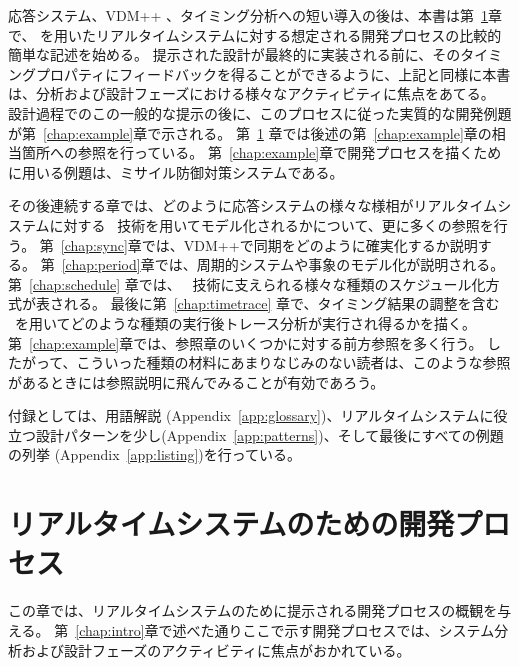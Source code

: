 \documentclass[\pformat,12pt]{jreport}
\begin{document}
応答システム、VDM++ 、タイミング分析への短い導入の後は、本書は第~\ref{chap:process}章で、 \VDMTools を用いたリアルタイムシステムに対する想定される開発プロセスの比較的簡単な記述を始める。
提示された設計が最終的に実装される前に、そのタイミングプロパティにフィードバックを得ることができるように、上記と同様に本書は、分析および設計フェーズにおける様々なアクティビティに焦点をあてる。
設計過程でのこの一般的な提示の後に、このプロセスに従った実質的な開発例題が第~\ref{chap:example}章で示される。
第~\ref{chap:process} 章では後述の第~\ref{chap:example}章の相当箇所への参照を行っている。
第~\ref{chap:example}章で開発プロセスを描くために用いる例題は、ミサイル防御対策システムである。

その後連続する章では、どのように応答システムの様々な様相がリアルタイムシステムに対する \VDMTools\ 技術を用いてモデル化されるかについて、更に多くの参照を行う。
第~\ref{chap:sync}章では、VDM++で同期をどのように確実化するか説明する。
第~\ref{chap:period}章では、周期的システムや事象のモデル化が説明される。
第~\ref{chap:schedule} 章では、 \VDMTools\ 技術に支えられる様々な種類のスケジュール化方式が表される。
最後に第~\ref{chap:timetrace} 章で、タイミング結果の調整を含む \VDMTools\ を用いてどのような種類の実行後トレース分析が実行され得るかを描く。
第~\ref{chap:example}章では、参照章のいくつかに対する前方参照を多く行う。
したがって、こういった種類の材料にあまりなじみのない読者は、このような参照があるときには参照説明に飛んでみることが有効であろう。

付録としては、用語解説 (Appendix~\ref{app:glossary})、リアルタイムシステムに役立つ設計パターンを少し(Appendix~\ref{app:patterns})、そして最後にすべての例題の列挙 (Appendix~\ref{app:listing})を行っている。

\chapter{リアルタイムシステムのための開発プロセス}\label{chap:process}

この章では、リアルタイムシステムのために提示される開発プロセスの概観を与える。
第~\ref{chap:intro}章で述べた通りここで示す開発プロセスでは、システム分析および設計フェーズのアクティビティに焦点がおかれている。
\end{document}
